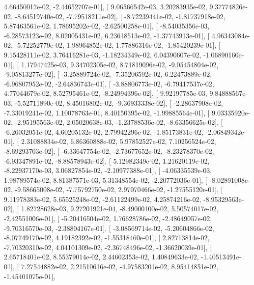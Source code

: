 \documentclass{article}
\begin{document}
          4.66450017e-02,  -2.44652707e-01],
       [  9.06566542e-03,   3.20283935e-02,   9.37774826e-02,
         -8.64519740e-02,  -7.79518211e-02],
       [ -8.72239441e-02,  -1.81737918e-02,   5.87463561e-02,
          1.78695202e-02,  -2.62500258e-01],
       [ -8.54035356e-03,  -6.28573123e-02,   8.02005431e-02,
          6.23618513e-02,  -1.37743913e-01],
       [  4.96343084e-02,  -5.72252779e-02,   1.98964852e-02,
          1.77886316e-02,  -1.85420239e-01],
       [  9.15428111e-02,   3.76416281e-03,  -1.18234349e-02,
          6.04390607e-02,  -1.06890160e-01],
       [  1.17947425e-03,   9.34702305e-02,   8.71819096e-02,
         -9.05454804e-02,  -9.05813277e-02],
       [ -3.25889724e-02,  -7.35206592e-02,   6.22473889e-02,
         -6.96807952e-02,  -2.64836743e-01],
       [ -3.88806773e-02,  -6.79417537e-02,   4.77044679e-02,
          8.52795461e-02,  -8.24994396e-02],
       [  9.92197785e-03,   9.84888567e-03,  -5.52711890e-02,
          8.45016802e-02,  -9.36933338e-02],
       [ -2.28637908e-02,  -7.33019241e-02,   1.10078763e-01,
          8.40150395e-02,  -1.99885564e-01],
       [  9.03335920e-02,  -2.95195563e-02,   2.05020638e-03,
         -1.23788536e-02,  -8.63356625e-02],
       [ -6.26032051e-02,   4.60205132e-02,   2.79942296e-02,
         -1.85173831e-02,  -2.06849342e-01],
       [  2.31088834e-02,   6.86360888e-02,   5.97852527e-02,
          7.10256524e-02,  -8.69293703e-02],
       [ -6.33647754e-02,  -2.73677652e-02,  -8.23278370e-02,
         -6.93347891e-02,  -8.88578943e-02],
       [  5.12982349e-02,   1.21620119e-02,  -8.22937170e-03,
          3.06827854e-02,  -2.10977388e-01],
       [ -4.06335539e-03,   1.98789574e-02,   8.81387571e-03,
          5.31348554e-02,  -2.20772036e-01],
       [ -8.02891008e-02,  -9.58665008e-02,  -7.75792750e-02,
          2.97070466e-02,  -1.27555120e-01],
       [  9.11978383e-02,   5.65525248e-02,  -2.61122499e-02,
          4.25874216e-02,  -8.95329563e-02],
       [  1.82728628e-03,   9.27201921e-04,  -8.49000100e-02,
          5.50574017e-02,  -2.42551006e-01],
       [ -5.20416504e-02,   1.76628786e-02,  -2.48649057e-02,
         -9.70316570e-03,  -2.38804167e-01],
       [ -3.08569714e-02,  -5.20604866e-02,  -8.07749170e-02,
          4.19182392e-02,  -1.55318460e-01],
       [  2.82713814e-02,  -7.70320310e-02,   4.04101309e-02,
         -2.36748496e-02,  -1.36620039e-01],
       [  2.65718401e-02,   8.55379014e-02,   2.44602353e-02,
          1.40849633e-02,  -1.40513491e-01],
       [  7.27544882e-02,   2.21510616e-02,  -4.97583201e-02,
          8.95414851e-02,  -1.45401075e-01],
\end{document}
